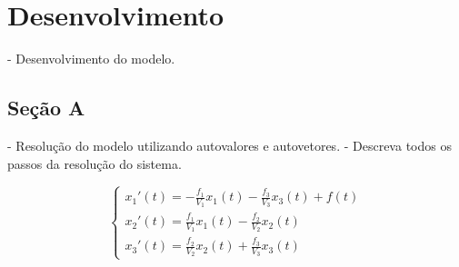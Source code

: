 \section{Desenvolvimento}

- Desenvolvimento do modelo.

\subsection{Seção A}

- Resolução do modelo utilizando autovalores e autovetores.
- Descreva todos os passos da resolução do sistema.

\begin{equation}
    \begin{cases}
      x_1'(t)=-\frac{f_1}{V_1}x_1(t)-\frac{f_3}{V_3}x_3(t)+f(t)\\
      x_2'(t)=\frac{f_1}{V_1}x_1(t)-\frac{f_2}{V_2}x_2(t)\\
      x_3'(t)=\frac{f_2}{V_2}x_2(t)+\frac{f_3}{V_3}x_3(t)
    \end{cases}
\end{equation}

